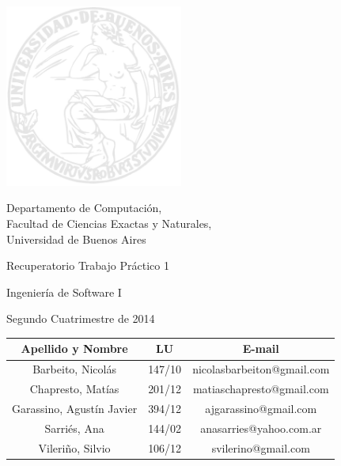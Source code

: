 \documentclass[a4paper, 10pt, twoside]{article}
\begin{document}

\thispagestyle{caratula}

\begin{center}

\hfill
\includegraphics[height=6cm]{img/logo_uba.jpg} 


Departamento de Computación,\\
Facultad de Ciencias Exactas y Naturales,\\
Universidad de Buenos Aires

\vspace{2cm}

\begin{Huge}
Recuperatorio Trabajo Práctico 1
\end{Huge}

\vspace{0.5cm}

\begin{Large}
Ingeniería de Software I
\end{Large}

\vspace{1cm}

Segundo Cuatrimestre de 2014

\vspace{4cm}

\begin{tabular}{|c|c|c|}
\hline
Apellido y Nombre & LU & E-mail\\
\hline
Barbeito, Nicolás	 		& 147/10 & nicolasbarbeiton@gmail.com\\
Chapresto, Mat\'ias 		& 201/12 & matiaschapresto@gmail.com\\
Garassino, Agust\'in Javier & 394/12 & ajgarassino@gmail.com\\
Sarriés, Ana 				& 144/02 & anasarries@yahoo.com.ar\\
Vileriño, Silvio 			& 106/12 & svilerino@gmail.com\\
\hline
\end{tabular}

\end{center}
\end{document}

